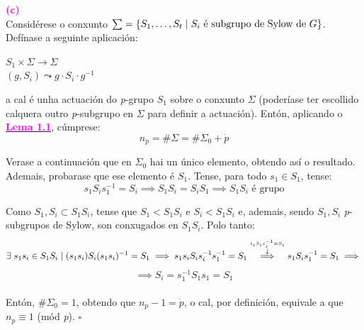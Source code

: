\documentclass[twoside]{report}
\newcommand{\magbf}[1]{\textcolor{magenta}{\textbf{#1}}} %
\theoremstyle{mystyle}
\begin{document}
\noindent \magbf{(c)}\\

\noindent Considérese o conxunto $\sum = \{S_{1}, \dots, S_{t} \hspace{1mm} | \hspace{1mm} S_{i} \text{ é subgrupo de Sylow de } G\}$.\\

\noindent Defínase a seguinte aplicación:

    \begin{center}
    $S_{1} \times \Sigma \longrightarrow \Sigma$ \\
    \vspace{2mm}
    \hspace{12mm} $(g,S_{i}) \leadsto g \cdot S_{i} \cdot g^{-1}$
    \end{center}  
    
\noindent a cal é unha actuación do \textit{p}-grupo $S_{1}$ sobre o conxunto $\Sigma$ (poderíase ter escollido calquera outro \textit{p}-subgrupo en $\Sigma$ para definir a actuación). Entón, aplicando o \hyperref[lem1.1]{\magbf{Lema 1.1}}, cúmprese:
$$n_{p} = \# \Sigma = \# \Sigma_{0} + \dot{p}$$

\noindent Verase a continuación que en $\Sigma_{0}$ hai un único elemento, obtendo así o resultado. Ademais, probarase que ese elemento é $S_{1}$. Tense, para todo $s_{1} \in S_{1}$, tense:\\
$$s_{1}S_{i}s_{1}^{-1} = S_{i} \implies S_{1}S_{i} = S_{i}S_{1} \implies S_{1}S_{i} \text{ é grupo}$$

\noindent Como $S_{1}, S_{i} \subset S_{1}S_{i}$, tense que $S_{1} < S_{1}S_{i}$ e $S_{i} < S_{1}S_{i}$ e, ademais, sendo $S_{1}, S_{i}$ \textit{p}-subgrupos de Sylow, son conxugados en $S_{1}S_{i}$. Polo tanto:
$$\exists \hspace{1mm} s_{1}s_{i} \in S_{1}S_{i} \hspace{1mm} | \hspace{1mm} (s_{1}s_{i})S_{i}(s_{1}s_{i})^{-1} = S_{1} \implies s_{1}s_{i}S_{i}s_{i}^{-1}s_{1}^{-1} = S_{1} \overset{\overset{s_{i}S_{i}s_{i}^{-1} = S_{i}}{\downarrow}}{\implies} s_{1}S_{i}s_{1}^{-1} = S_{1} \implies$$
$$\implies S_{i} = s_{1}^{-1}S_{1}s_{1} = S_{1}$$\\

\noindent Entón, $\# \Sigma_{0} = 1$, obtendo que $n_{p} - 1 = \dot{p}$, o cal, por definición, equivale a que $n_{p} \equiv 1$ (mód \textit{p}). $\square$\\
\end{document}
